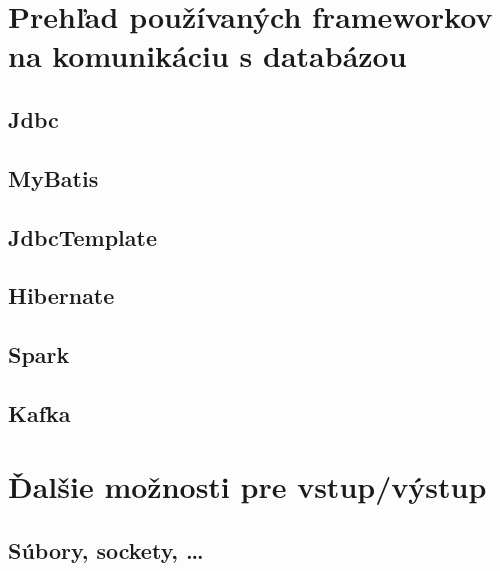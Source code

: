 
\chapter{Prehľad používaných frameworkov na komunikáciu s databázou}

\section{Jdbc}

\section{MyBatis}

\section{JdbcTemplate}

\section{Hibernate}

\section{Spark}

\section{Kafka}


\chapter{Ďalšie možnosti pre vstup/výstup}

\section{Súbory, sockety, \dots}


